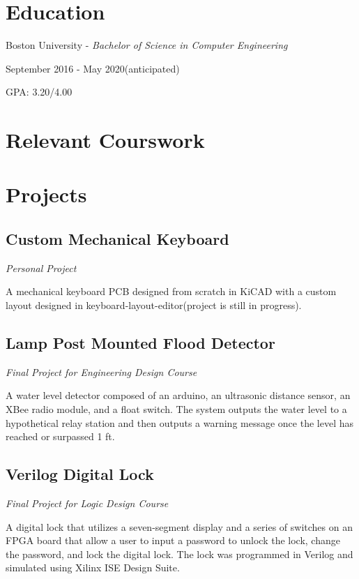 \documentclass{article}
\begin{document}
\section{Education}
Boston University - \textit{Bachelor of Science in Computer Engineering}

September 2016 - May 2020(anticipated)

GPA: 3.20/4.00

\section{Relevant Courswork}


\section{Projects}
\subsection{Custom Mechanical Keyboard} \textit{Personal Project}

A mechanical keyboard PCB designed from scratch in KiCAD with a custom layout designed in keyboard-layout-editor(project is still in progress).
\subsection{Lamp Post Mounted Flood Detector} \textit{Final Project for Engineering Design Course}

A water level detector composed of an arduino, an ultrasonic distance sensor, an XBee radio module, and a float switch. The system outputs the water level to a hypothetical relay station and then outputs a warning message once the level has reached or surpassed 1 ft.
\subsection{Verilog Digital Lock} \textit{Final Project for Logic Design Course}

A digital lock that utilizes a seven-segment display and a series of switches on an FPGA board that allow a user to input a password to unlock the lock, change the password, and lock the digital lock. The lock was programmed in Verilog and simulated using Xilinx ISE Design Suite.
\end{document}
